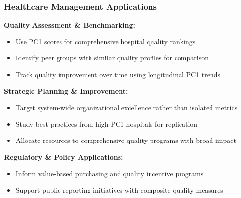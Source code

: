 \documentclass[aspectratio=169]{beamer}
\begin{document}
\begin{frame}
    \frametitle{Healthcare Management Applications}
    \textbf{Quality Assessment \& Benchmarking:}
    \begin{itemize}
        \item Use PC1 scores for comprehensive hospital quality rankings \pause
        \item Identify peer groups with similar quality profiles for comparison \pause
        \item Track quality improvement over time using longitudinal PC1 trends \pause
    \end{itemize}
    \vspace{6pt}
    \textbf{Strategic Planning \& Improvement:}
    \begin{itemize}
        \item Target system-wide organizational excellence rather than isolated metrics \pause
        \item Study best practices from high PC1 hospitals for replication \pause
        \item Allocate resources to comprehensive quality programs with broad impact \pause
    \end{itemize}
    \vspace{6pt}
    \textbf{Regulatory \& Policy Applications:}
    \begin{itemize}
        \item Inform value-based purchasing and quality incentive programs \pause
        \item Support public reporting initiatives with composite quality measures \pause
    \end{itemize}
\end{frame}
\end{document}
